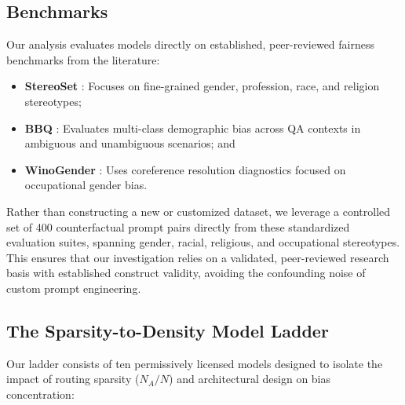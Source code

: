 \documentclass[11pt,a4paper]{article}
\begin{document}
\subsection{Benchmarks}
Our analysis evaluates models directly on established, peer-reviewed fairness benchmarks from the literature:
\begin{itemize}
    \item \textbf{StereoSet} \cite{stereoset}: Focuses on fine-grained gender, profession, race, and religion stereotypes;
    \item \textbf{BBQ} \cite{bbq}: Evaluates multi-class demographic bias across QA contexts in ambiguous and unambiguous scenarios; and
    \item \textbf{WinoGender} \cite{winogender}: Uses coreference resolution diagnostics focused on occupational gender bias.
\end{itemize}
Rather than constructing a new or customized dataset, we leverage a controlled set of 400 counterfactual prompt pairs directly from these standardized evaluation suites, spanning gender, racial, religious, and occupational stereotypes. This ensures that our investigation relies on a validated, peer-reviewed research basis with established construct validity, avoiding the confounding noise of custom prompt engineering.

\subsection{The Sparsity-to-Density Model Ladder}
Our ladder consists of ten permissively licensed models designed to isolate the impact of routing sparsity ($N_A/N$) and architectural design on bias concentration:
\end{document}

